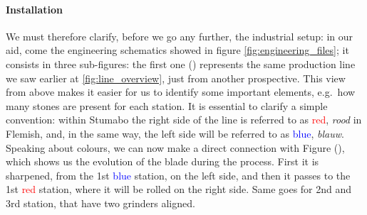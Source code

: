 \paragraph{Installation} We must therefore clarify, before we go any further, the industrial setup: in our aid, come the engineering schematics showed in figure \ref{fig:engineering_files};
it consists in three sub-figures: the first one () represents the same production line we saw earlier at \ref{fig:line_overview}, just from another prospective. 
This view from above makes it easier for us to identify some important elements, e.g.\ how many stones are present for each station.
It is essential to clarify a simple convention: within Stumabo the right side of the line is referred to as \textcolor{red}{red}, \textit{rood} in Flemish, and, in the same way, 
the left side will be referred to as \textcolor{blue}{blue}, \textit{blauw}. 
Speaking about colours, we can now make a direct connection with Figure (), which shows us the evolution of the blade during the process.
First it is sharpened, from the 1st \textcolor{blue}{blue} station, on the left side, and then it passes to the 1st \textcolor{red}{red} station, where it will be rolled on the right side. 
Same goes for 2nd and 3rd station, that have two grinders aligned. 

